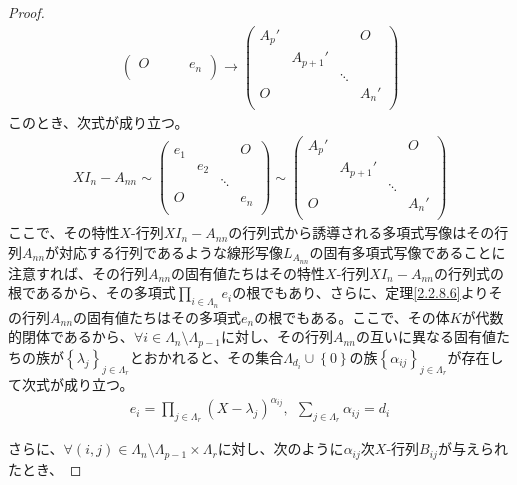 \documentclass[dvipdfmx]{jsarticle}
\begin{document}
\begin{proof}
\begin{align*}
\begin{pmatrix}
O & \  & \  & e_{n} \\
\end{pmatrix} \rightarrow \begin{pmatrix}
A_{p}' & \  & \  & O \\
\  & A_{p + 1}' & \  & \  \\
\  & \  & \ddots & \  \\
O & \  & \  & A_{n}' \\
\end{pmatrix}
\end{align*}
このとき、次式が成り立つ。
\begin{align*}
XI_{n} - A_{nn} \sim \begin{pmatrix}
e_{1} & \  & \  & O \\
\  & e_{2} & \  & \  \\
\  & \  & \ddots & \  \\
O & \  & \  & e_{n} \\
\end{pmatrix} \sim \begin{pmatrix}
A_{p}' & \  & \  & O \\
\  & A_{p + 1}' & \  & \  \\
\  & \  & \ddots & \  \\
O & \  & \  & A_{n}' \\
\end{pmatrix}
\end{align*}
ここで、その特性$X$-行列$XI_{n} - A_{nn}$の行列式から誘導される多項式写像はその行列$A_{nn}$が対応する行列であるような線形写像$L_{A_{nn}}$の固有多項式写像であることに注意すれば、その行列$A_{nn}$の固有値たちはその特性$X$-行列$XI_{n} - A_{nn}$の行列式の根であるから、その多項式$\prod_{i \in \varLambda_{n}} e_{i}$の根でもあり、さらに、定理\ref{2.2.8.6}よりその行列$A_{nn}$の固有値たちはその多項式$e_{n}$の根でもある。ここで、その体$K$が代数的閉体であるから、$\forall i \in \varLambda_{n} \setminus \varLambda_{p - 1}$に対し、その行列$A_{nn}$の互いに異なる固有値たちの族が$\left\{ \lambda_{j} \right\}_{j \in \varLambda_{r}}$とおかれると、その集合$\varLambda_{d_{i}} \cup \left\{ 0 \right\}$の族$\left\{ \alpha_{ij} \right\}_{j \in \varLambda_{r}}$が存在して次式が成り立つ。
\begin{align*}
e_{i} = \prod_{j \in \varLambda_{r}} \left( X - \lambda_{j} \right)^{\alpha_{ij}},\ \ \sum_{j \in \varLambda_{r}} \alpha_{ij} = d_{i}
\end{align*}\par
さらに、$\forall(i,j) \in \varLambda_{n} \setminus \varLambda_{p - 1} \times \varLambda_{r}$に対し、次のように$\alpha_{ij}$次$X$-行列$B_{ij}$が与えられたとき、

\end{proof}
\end{document}
